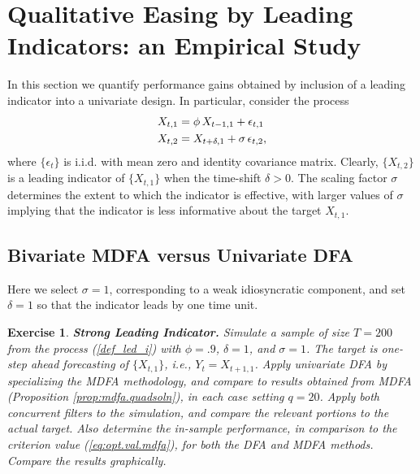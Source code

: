 \documentclass[a4paper]{book}
\newtheorem{Exercise}{Exercise}
\begin{document}
\section{Qualitative Easing by Leading Indicators: an Empirical Study}
   \label{sec:leading.ind}

In this section we quantify performance gains 
  obtained by inclusion of a leading indicator into a univariate design.
 In particular, consider the process
\begin{align}
 X_{t,1} & = \phi \, X_{t-1,1} + \epsilon_{t,1} \notag \\
 X_{t,2} & = X_{t+\delta,1} + \sigma \, \epsilon_{t,2}, \label{def_led_i}
\end{align} 
  where $\{ \epsilon_t \}$ is i.i.d. with mean zero and identity covariance matrix.
  Clearly, $\{ X_{t,2} \}$ is a leading indicator of $\{ X_{t,1} \}$ when
 the time-shift  $\delta > 0$.   The scaling factor $\sigma$ determines  
 the extent to which the indicator is effective, with 
 larger values of  $\sigma$ implying that the indicator is less 
informative about the target $X_{t,1}$.

\subsection{Bivariate MDFA versus Univariate DFA}
 \label{bimdfaudfa}

Here   we select $\sigma=1$, corresponding to a weak
 idiosyncratic component, and set $\delta=1$ so that the indicator
 leads by one time unit.
 

\begin{Exercise} {\bf Strong Leading Indicator.} \rm
\label{exer:bimdfa-udfa}
 Simulate a sample of size $T=200$ from the process (\ref{def_led_i}) with
 $\phi = .9$, $\delta = 1$, and $\sigma = 1$.  The target is one-step
 ahead forecasting of $\{ X_{t,1} \}$, i.e., $Y_t = X_{t+1,1}$.
  Apply univariate DFA by specializing the MDFA methodology, and compare
 to results obtained from MDFA  (Proposition \ref{prop:mdfa.quadsoln}),
 in each case setting $q=20$.  
  Apply both concurrent filters 
 to the simulation, and compare the relevant portions to the actual
 target.  Also determine the in-sample performance, in comparison to the
   criterion value  (\ref{eq:opt.val.mdfa}), for both the DFA and MDFA methods.
 Compare the results graphically.
\end{Exercise}
\end{document}
